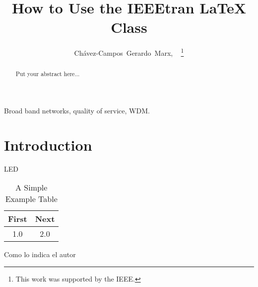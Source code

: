 \documentclass[9pt]{IEEEtran}
\title{How to Use the IEEEtran \LaTeX{} Class}
\author{Chávez-Campos~Gerardo~Marx,
~\IEEEmembership{Member,~IEEE.}%
\thanks{This work was supported by the IEEE.}}
\begin{document}
\maketitle

\begin{abstract}
Put your abstract here...
\end{abstract}


\begin{IEEEkeywords}
Broad band networks, quality of service, WDM.
\end{IEEEkeywords}

\section{Introduction}
 LED

\begin{table}[!t]
\renewcommand{\arraystretch}{1.3}
\caption{A Simple Example Table}
\label{table_example}
\centering
\begin{tabular}{cc}
\bfseries First & \bfseries Next\\
\hline
1.0 & 2.0\\
\hline
\end{tabular}
\end{table}

Como lo indica el autor \cite{gratzer2013math}




\end{document}
